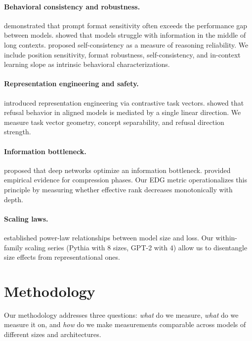 \documentclass{article}
\begin{document}
\paragraph{Behavioral consistency and robustness.}
\citet{sclar2023quantifying} demonstrated that prompt format sensitivity often exceeds the performance gap between models.
\citet{liu2023lost} showed that models struggle with information in the middle of long contexts.
\citet{wang2022self} proposed self-consistency as a measure of reasoning reliability.
We include position sensitivity, format robustness, self-consistency, and in-context learning slope as intrinsic behavioral characterizations.

\paragraph{Representation engineering and safety.}
\citet{zou2023representation} introduced representation engineering via contrastive task vectors.
\citet{arditi2024refusal} showed that refusal behavior in aligned models is mediated by a single linear direction.
We measure task vector geometry, concept separability, and refusal direction strength.

\paragraph{Information bottleneck.}
\citet{tishby2015deep} proposed that deep networks optimize an information bottleneck.
\citet{shwartz2017opening} provided empirical evidence for compression phases.
Our EDG metric operationalizes this principle by measuring whether effective rank decreases monotonically with depth.

\paragraph{Scaling laws.}
\citet{kaplan2020scaling} established power-law relationships between model size and loss.
Our within-family scaling series (Pythia with 8 sizes, GPT-2 with 4) allow us to disentangle size effects from representational ones.

\section{Methodology}
\label{sec:methodology}

Our methodology addresses three questions: \emph{what} do we measure, \emph{what} do we measure it on, and \emph{how} do we make measurements comparable across models of different sizes and architectures.
\end{document}
